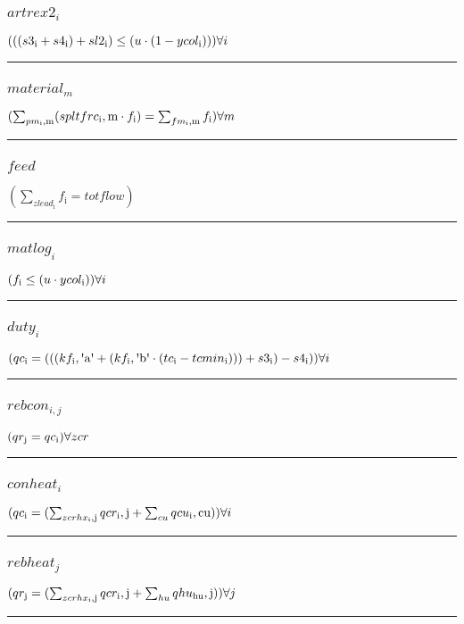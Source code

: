\documentclass[11pt]{article}
\begin{document}
\subsubsection*{$artrex2_{i}$}
$
(((s3_\text{i} + s4_\text{i}) + sl2_\text{i}) \leq (u \cdot (1 - ycol_\text{i})))\hfill \forall i
$
\vspace{5pt}
\hrule
\subsubsection*{$material_{m}$}
$
(\sum_{pm_\text{i},\text{m}} (spltfrc_\text{i},\text{m} \cdot f_\text{i}) = \sum_{fm_\text{i},\text{m}} f_\text{i})\hfill \forall m
$
\vspace{5pt}
\hrule
\subsubsection*{$feed$}
$
(\sum_{zlead_\text{i}} f_\text{i} = totflow)
$
\vspace{5pt}
\hrule
\subsubsection*{$matlog_{i}$}
$
(f_\text{i} \leq (u \cdot ycol_\text{i}))\hfill \forall i
$
\vspace{5pt}
\hrule
\subsubsection*{$duty_{i}$}
$
(qc_\text{i} = (((kf_\text{i},\text{\textquotesingle a\textquotesingle} + (kf_\text{i},\text{\textquotesingle b\textquotesingle} \cdot (tc_\text{i} - tcmin_\text{i}))) + s3_\text{i}) - s4_\text{i}))\hfill \forall i
$
\vspace{5pt}
\hrule
\subsubsection*{$rebcon_{i,j}$}
$
(qr_\text{j} = qc_\text{i})\hfill \forall zcr
$
\vspace{5pt}
\hrule
\subsubsection*{$conheat_{i}$}
$
(qc_\text{i} = (\sum_{zcrhx_\text{i},\text{j}} qcr_\text{i},\text{j} + \sum_{cu} qcu_\text{i},\text{cu}))\hfill \forall i
$
\vspace{5pt}
\hrule
\subsubsection*{$rebheat_{j}$}
$
(qr_\text{j} = (\sum_{zcrhx_\text{i},\text{j}} qcr_\text{i},\text{j} + \sum_{hu} qhu_\text{hu},\text{j}))\hfill \forall j
$
\vspace{5pt}
\hrule
\end{document}

